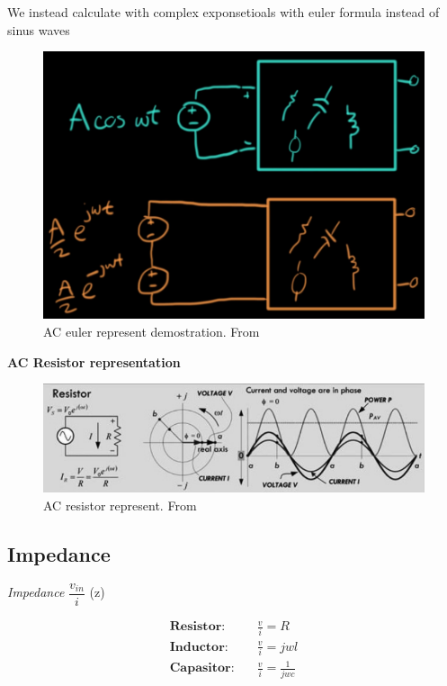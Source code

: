We instead calculate with complex exponsetioals with euler formula instead of sinus waves
\begin{figure}[h]
    \centering
    \includegraphics[width=13cm]{image/AC-euler-representation-demostration.png}
    \caption{AC euler represent demostration. From \cite{}}
\end{figure}

\vspace{10mm}
\textbf{AC Resistor representation}
\begin{figure}[h]
    \centering
    \includegraphics[width=13cm]{image/AC_resistor_representation.png}
    \caption{AC resistor represent. From \cite{}}
\end{figure}


\newpage
\subsection{Impedance}
\textit{Impedance} $\dfrac{v_{in}}{i}$ (z)

\begin{align*}
  \textbf{Resistor}: &\quad \frac{v}{i}=R \\
  \textbf{Inductor}: &\quad \frac{v}{i}=jwl \\
  \textbf{Capasitor}: &\quad \frac{v}{i}=\frac{1}{jwc}\\
\end{align*}

